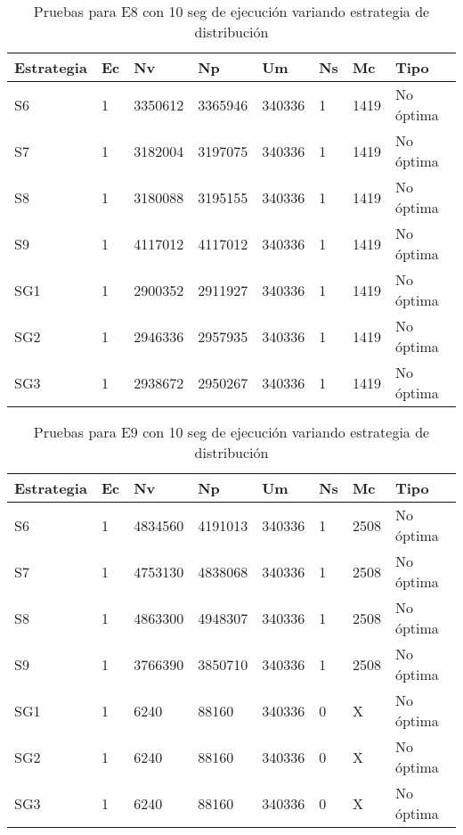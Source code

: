 \begin{center}
\begin{longtable}{|p{3cm}|p{1.0cm}|p{1.6cm}|p{1.6cm}|p{1.1cm}|p{1.1cm}|p{1.1cm}|p{2.7cm}|}
	\caption{Pruebas para E8 con 10 seg de ejecución variando estrategia de distribución} \\
	\hline
	\cellcolor[gray]{0.9} \textbf{Estrategia} & \cellcolor[gray]{0.9}\textbf{Ec} & \cellcolor[gray]{0.9}\textbf{Nv} & \cellcolor[gray]{0.9}\textbf{Np} & \cellcolor[gray]{0.9}\textbf{Um} & \cellcolor[gray]{0.9}\textbf{Ns} &  \cellcolor[gray]{0.9}\textbf{Mc} & \cellcolor[gray]{0.9}\textbf{Tipo}\\	\hline
	S6& 1 &3350612  &3365946 &340336  &1 &1419&No óptima \\
	\hline
	S7& 1 &3182004  &3197075 &340336  &1 &1419&No óptima \\
	\hline
	S8& 1 &3180088  &3195155 &340336  &1 &1419&No óptima \\
	\hline
	S9& 1 &4117012  &4117012 &340336  &1 &1419&No óptima \\
	\hline
	SG1& 1 &2900352  &2911927 &340336  &1 &1419&No óptima \\
	\hline
	SG2& 1 &2946336  &2957935 &340336  &1 &1419&No óptima \\
	\hline
	SG3& 1 &2938672  &2950267 &340336  &1 &1419&No óptima \\
	\hline
\end{longtable}	
\end{center}

\begin{center}
\begin{longtable}{|p{3cm}|p{1.0cm}|p{1.6cm}|p{1.6cm}|p{1.1cm}|p{1.1cm}|p{1.1cm}|p{2.7cm}|}
	\caption{Pruebas para E9 con 10 seg de ejecución variando estrategia de distribución} \\
	\hline
	\cellcolor[gray]{0.9} \textbf{Estrategia} & \cellcolor[gray]{0.9}\textbf{Ec} & \cellcolor[gray]{0.9}\textbf{Nv} & \cellcolor[gray]{0.9}\textbf{Np} & \cellcolor[gray]{0.9}\textbf{Um} & \cellcolor[gray]{0.9}\textbf{Ns} &  \cellcolor[gray]{0.9}\textbf{Mc} & \cellcolor[gray]{0.9}\textbf{Tipo}\\	\hline
	S6& 1 &4834560  &4191013 &340336  &1 &2508&No óptima \\
	\hline
	S7& 1 &4753130  &4838068 &340336  &1 &2508&No óptima \\
	\hline
	S8& 1 &4863300  &4948307 &340336  &1 &2508&No óptima \\
	\hline
	S9& 1 &3766390  &3850710 &340336  &1 &2508&No óptima \\
	\hline
	SG1& 1 &6240  &88160 &340336  &0 &X&No óptima \\
	\hline
	SG2& 1 &6240  &88160 &340336  &0 &X&No óptima \\
	\hline
	SG3& 1 &6240  &88160 &340336  &0 &X&No óptima \\
	\hline
\end{longtable}	
\end{center}

